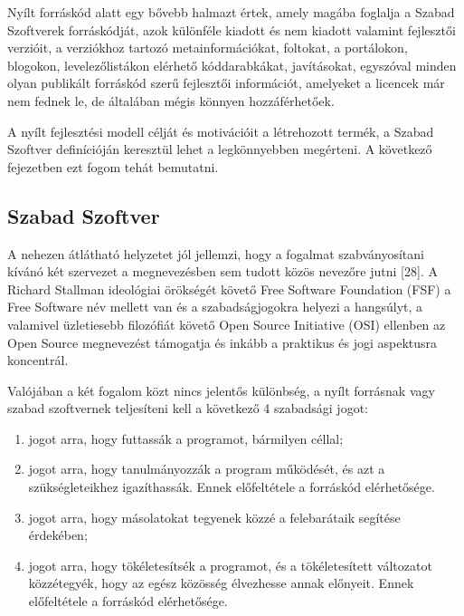 \documentclass[12pt,magyar,a4paper,oneside]{scrreprt}
\providecommand{\tightlist}{%
  \setlength{\itemsep}{0pt}\setlength{\parskip}{0pt}}
\begin{document}
Nyílt forráskód alatt egy bővebb halmazt értek, amely magába foglalja a
Szabad Szoftverek forráskódját, azok különféle kiadott és nem kiadott
valamint fejlesztői verzióit, a verziókhoz tartozó metainformációkat,
foltokat, a portálokon, blogokon, levelezőlistákon elérhető
kóddarabkákat, javításokat, egyszóval minden olyan publikált forráskód
szerű fejlesztői információt, amelyeket a licencek már nem fednek le, de
általában mégis könnyen hozzáférhetőek.

A nyílt fejlesztési modell célját és motivációit a létrehozott termék, a
Szabad Szoftver definícióján keresztül lehet a legkönnyebben megérteni.
A következő fejezetben ezt fogom tehát bemutatni.

\hypertarget{szabad-szoftver}{%
\subsection{Szabad Szoftver}\label{szabad-szoftver}}

A nehezen átlátható helyzetet jól jellemzi, hogy a fogalmat
szabványosítani kívánó két szervezet a megnevezésben sem tudott közös
nevezőre jutni {[}28{]}. A Richard Stallman ideológiai örökségét követő
Free Software Foundation (FSF) a Free Software név mellett van és a
szabadságjogokra helyezi a hangsúlyt, a valamivel üzletiesebb filozófiát
követő Open Source Initiative (OSI) ellenben az Open Source megnevezést
támogatja és inkább a praktikus és jogi aspektusra koncentrál.

Valójában a két fogalom közt nincs jelentős különbség, a nyílt forrásnak
vagy szabad szoftvernek teljesíteni kell a következő 4 szabadsági jogot:

\begin{enumerate}
\def\labelenumi{\arabic{enumi}.}
\setcounter{enumi}{-1}
\tightlist
\item
  jogot arra, hogy futtassák a programot, bármilyen céllal;
\item
  jogot arra, hogy tanulmányozzák a program működését, és azt a
  szükségleteikhez igazíthassák. Ennek előfeltétele a forráskód
  elérhetősége.
\item
  jogot arra, hogy másolatokat tegyenek közzé a felebarátaik segítése
  érdekében;
\item
  jogot arra, hogy tökéletesítsék a programot, és a tökéletesített
  változatot közzétegyék, hogy az egész közösség élvezhesse annak
  előnyeit. Ennek előfeltétele a forráskód elérhetősége.
\end{enumerate}
\end{document}
